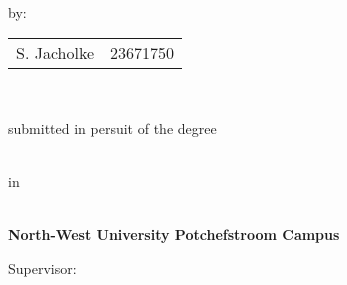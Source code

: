 

\thispagestyle{empty}
\begin{titlepage}
\thispagestyle{empty}


\begin{center}
\large

\hfill
\vfill
\vfill
\begingroup
\color{Maroon}\Large{} \\ \bigskip %
\endgroup
\vspace{5mm}
by: \\
 \begin{tabular}{l  r} 
 S. Jacholke & 23671750 \\

 \end{tabular}			\\
 
\vfill

submitted in persuit of the degree\\
\vspace{8mm}

\\

in\\

\\

\vfill

\textbf{North-West University  Potchefstroom Campus}\\

			
\vspace*{0.8cm}

\begin{flushleft}
Supervisor: \mySupervisor

\myLocation

\myTime

\myVersion

\end{flushleft}



\vfill

\end{center}

\end{titlepage}





